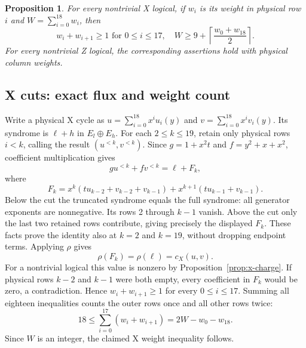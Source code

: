 \documentclass{article}
\newtheorem{proposition}{Proposition}
\begin{document}
\begin{proposition}\label{prop:transport}
  For every nontrivial X logical, if \(w_i\) is its weight in physical row \(i\) and
  \(W = \sum_{i=0}^{18} w_i\), then
  \begin{equation}
    w_i + w_{i+1} \ge 1 \text{ for } 0 \le i \le 17,
    \quad W \ge 9 + \left\lceil \frac{w_0 + w_{18}}{2} \right\rceil.
  \end{equation}
  For every nontrivial Z logical, the corresponding assertions hold with physical column
  weights.
\end{proposition}

\subsection{X cuts: exact flux and weight count}\label{sec:x-cuts}

Write a physical X cycle as \(u = \sum_{i=0}^{18} x^i u_i(y)\) and
\(v = \sum_{i=0}^{18} x^i v_i(y)\). Its syndrome is \(\ell + h\) in \(E_l \oplus E_h\). For
each \(2 \le k \le 19\), retain only physical rows \(i < k\), calling the result
\((u^{<k}, v^{<k})\). Since \(g = 1 + x^2 t\) and \(f = y^2 + x + x^2\), coefficient
multiplication gives
\begin{equation}
  g u^{<k} + f v^{<k} = \ell + F_k,
\end{equation}
where
\begin{equation}
  F_k = x^k (t u_{k-2} + v_{k-2} + v_{k-1})
  + x^{k+1} (t u_{k-1} + v_{k-1}).
\end{equation}
Below the cut the truncated syndrome equals the full syndrome: all generator exponents are
nonnegative. Its rows 2 through \(k - 1\) vanish. Above the cut only the last two retained
rows contribute, giving precisely the displayed \(F_k\). These facts prove the identity also
at \(k = 2\) and \(k = 19\), without dropping endpoint terms. Applying \(\rho\) gives
\begin{equation}
  \rho(F_k) = \rho(\ell) = c_X(u,v).
\end{equation}
For a nontrivial logical this value is nonzero by Proposition~\ref{prop:x-charge}. If physical
rows \(k - 2\) and \(k - 1\) were both empty, every coefficient in \(F_k\) would be zero, a
contradiction. Hence \(w_i + w_{i+1} \ge 1\) for every \(0 \le i \le 17\). Summing all
eighteen inequalities counts the outer rows once and all other rows twice:
\begin{equation}
  18 \le \sum_{i=0}^{17} (w_i + w_{i+1}) = 2W - w_0 - w_{18}.
\end{equation}
Since \(W\) is an integer, the claimed X weight inequality follows.
\end{document}
